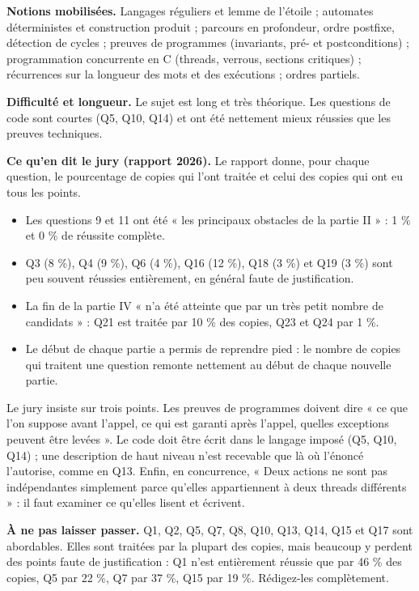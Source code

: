 \documentclass[11pt,a4paper]{article}
\providecommand{\tightlist}{\setlength{\itemsep}{0pt}\setlength{\parskip}{0pt}}
\begin{document}
\textbf{Notions mobilisées.} Langages réguliers et lemme de l'étoile ; automates déterministes et construction produit ; parcours en profondeur, ordre postfixe, détection de cycles ; preuves de programmes (invariants, pré- et postconditions) ; programmation concurrente en C (threads, verrous, sections critiques) ; récurrences sur la longueur des mots et des exécutions ; ordres partiels.

\textbf{Difficulté et longueur.} Le sujet est long et très théorique. Les questions de code sont courtes (Q5, Q10, Q14) et ont été nettement mieux réussies que les preuves techniques.

\textbf{Ce qu'en dit le jury (rapport 2026).} Le rapport donne, pour chaque question, le pourcentage de copies qui l'ont traitée et celui des copies qui ont eu tous les points.

\begin{itemize}
\tightlist
\item
  Les questions 9 et 11 ont été « les principaux obstacles de la partie II » : 1 \% et 0 \% de réussite complète.
\item
  Q3 (8 \%), Q4 (9 \%), Q6 (4 \%), Q16 (12 \%), Q18 (3 \%) et Q19 (3 \%) sont peu souvent réussies entièrement, en général faute de justification.
\item
  La fin de la partie IV « n'a été atteinte que par un très petit nombre de candidats » : Q21 est traitée par 10 \% des copies, Q23 et Q24 par 1 \%.
\item
  Le début de chaque partie a permis de reprendre pied : le nombre de copies qui traitent une question remonte nettement au début de chaque nouvelle partie.
\end{itemize}

Le jury insiste sur trois points. Les preuves de programmes doivent dire « ce que l'on suppose avant l'appel, ce qui est garanti après l'appel, quelles exceptions peuvent être levées ». Le code doit être écrit dans le langage imposé (Q5, Q10, Q14) ; une description de haut niveau n'est recevable que là où l'énoncé l'autorise, comme en Q13. Enfin, en concurrence, « Deux actions ne sont pas indépendantes simplement parce qu'elles appartiennent à deux threads différents » : il faut examiner ce qu'elles lisent et écrivent.

\textbf{À ne pas laisser passer.} Q1, Q2, Q5, Q7, Q8, Q10, Q13, Q14, Q15 et Q17 sont abordables. Elles sont traitées par la plupart des copies, mais beaucoup y perdent des points faute de justification : Q1 n'est entièrement réussie que par 46 \% des copies, Q5 par 22 \%, Q7 par 37 \%, Q15 par 19 \%. Rédigez-les complètement.
\end{document}
